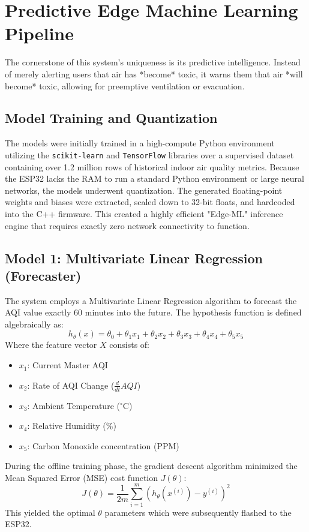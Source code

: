 \documentclass[12pt,journal,onecolumn,a4paper]{IEEEtran}
\begin{document}
\section{Predictive Edge Machine Learning Pipeline}
The cornerstone of this system's uniqueness is its predictive intelligence. Instead of merely alerting users that air has *become* toxic, it warns them that air *will become* toxic, allowing for preemptive ventilation or evacuation.

\subsection{Model Training and Quantization}
The models were initially trained in a high-compute Python environment utilizing the \texttt{scikit-learn} and \texttt{TensorFlow} libraries over a supervised dataset containing over 1.2 million rows of historical indoor air quality metrics. 
Because the ESP32 lacks the RAM to run a standard Python environment or large neural networks, the models underwent quantization. The generated floating-point weights and biases were extracted, scaled down to 32-bit floats, and hardcoded into the C++ firmware. This created a highly efficient "Edge-ML" inference engine that requires exactly zero network connectivity to function.

\subsection{Model 1: Multivariate Linear Regression (Forecaster)}
The system employs a Multivariate Linear Regression algorithm to forecast the AQI value exactly 60 minutes into the future. The hypothesis function is defined algebraically as:
\begin{equation}
h_\theta(x) = \theta_0 + \theta_1 x_1 + \theta_2 x_2 + \theta_3 x_3 + \theta_4 x_4 + \theta_5 x_5
\end{equation}
Where the feature vector $X$ consists of:
\begin{itemize}
    \item $x_1$: Current Master AQI
    \item $x_2$: Rate of AQI Change ($\frac{d}{dt} AQI$)
    \item $x_3$: Ambient Temperature ($^\circ$C)
    \item $x_4$: Relative Humidity (\%)
    \item $x_5$: Carbon Monoxide concentration (PPM)
\end{itemize}
During the offline training phase, the gradient descent algorithm minimized the Mean Squared Error (MSE) cost function $J(\theta)$:
\begin{equation}
J(\theta) = \frac{1}{2m} \sum_{i=1}^{m} \left( h_\theta(x^{(i)}) - y^{(i)} \right)^2
\end{equation}
This yielded the optimal $\theta$ parameters which were subsequently flashed to the ESP32.
\end{document}
